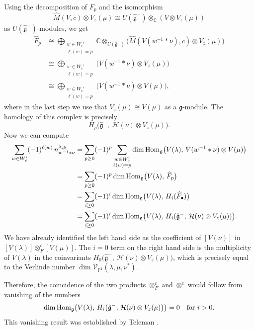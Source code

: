 \documentclass[12pt]{article}
\begin{document}
Using the decomposition of \(F_p\) and the isomorphism
\[
\widehat M(V,c)\otimes V_z(\mu)\cong U(\hat{\mathfrak g}^-)\otimes_{\mathbb C}(V\otimes V_z(\mu))
\]
as \(U(\hat{\mathfrak g}^-)\)-modules, we get
\begin{align*}
\widehat F_p
&\cong
\bigoplus_{\substack{w\in W_c'\\ \ell(w)=p}}
\mathbb C\otimes_{U(\hat{\mathfrak g}^-)}
\bigl(\widehat M(V(w^{-1}*\nu),c)\otimes V_z(\mu)\bigr) \\
&\cong
\bigoplus_{\substack{w\in W_c'\\ \ell(w)=p}}
\bigl(V(w^{-1}*\nu)\otimes V_z(\mu)\bigr) \\
&\cong
\bigoplus_{\substack{w\in W_c'\\ \ell(w)=p}}
\bigl(V(w^{-1}*\nu)\otimes V(\mu)\bigr),
\end{align*}
where in the last step we use that \(V_z(\mu)\cong V(\mu)\) as a \(\mathfrak g\)-module. The homology of this complex is precisely
\[
H_p\bigl(\hat{\mathfrak g}^-,\,\mathcal H(\nu)\otimes V_z(\mu)\bigr).
\]
Now we can compute
\begin{align*}
\sum_{w\in W_c'} (-1)^{\ell(w)}\, n^{\lambda,\mu}_{w^{-1}*\nu}
&=
\sum_{p\ge 0} (-1)^p
\sum_{\substack{w\in W_c' \\ \ell(w)=p}}
\dim \operatorname{Hom}_{\mathfrak g}\bigl(V(\lambda),\, V(w^{-1}*\nu)\otimes V(\mu)\bigr) \\
&=
\sum_{p\ge 0} (-1)^p
\dim \operatorname{Hom}_{\mathfrak g}\bigl(V(\lambda),\, \widehat F_p\bigr) \\
&=
\sum_{i\ge 0} (-1)^i
\dim \operatorname{Hom}_{\mathfrak g}\bigl(V(\lambda),\, H_i(\widehat F_\bullet)\bigr) \\
&=
\sum_{i\ge 0} (-1)^i
\dim \operatorname{Hom}_{\mathfrak g}\bigl(V(\lambda),\,
H_i(\hat{\mathfrak g}^-,\, \mathcal H(\nu)\otimes V_z(\mu))\bigr).
\end{align*}
We have already identified the left hand side as the coefficient of $[V(\nu)]$ in $[V(\lambda)]\otimes_F^c [V(\mu)]$. The $i=0$ term on the right hand side is the multiplicity of $V(\lambda)$ in the coinvariants
$H_0\bigl(\hat{\mathfrak g}^-,\,\mathcal H(\nu)\otimes V_z(\mu)\bigr)$, which is precisely equal to the Verlinde number $\dim \mathcal V_{\mathbb P^1}(\lambda,\mu,\nu^*)$.

Therefore, the coincidence of the two products $\otimes_F^c$ and $\otimes^c$ would follow from vanishing of the numbers
\[\dim \operatorname{Hom}_{\mathfrak g}\bigl(V(\lambda),\,
H_i\bigl(\hat{\mathfrak g}^-,\, \mathcal H(\nu)\otimes V_z(\mu)\bigr)\bigr) = 0
\quad\text{for } i>0.\]
This vanishing result was established by Teleman \cite{teleman1995}.
\end{document}
